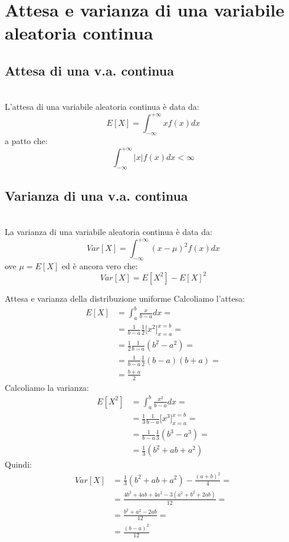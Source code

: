 \documentclass[12pt]{report}
\newcommand{\nmu}{}
\begin{document}
  	 	\section{Attesa e varianza di una variabile aleatoria continua}
  	 	\subsection{Attesa di una v.a. continua} \quad \\
  	 	L'attesa di una variabile aleatoria continua è data da:
  	 	\[
  	 	E[X] = \int_{-\infty}^{+\infty}xf(x)dx
  	 	\]
  	 	a patto che:
  	 	\[
  	 	\int_{-\infty}^{+\infty}|x|f(x)dx < \infty
  	 	\]
  	 	\subsection{Varianza di una v.a. continua} \quad \\
  	 	La varianza di una variabile aleatoria continua è data da:
  	 	\[
  	 	Var[X] = \int_{-\infty}^{+\infty}(x - \mu)^2f(x)dx
  	 	\]
  	 	ove $\mu = E[X]$ ed è ancora vero che:
  	 	\[
  	 	Var[X] = E[X^2] - E[X]^2
  	 	\]
  	 	\begin{example}{\nmu Attesa e varianza della distribuzione uniforme}{}
  	 		Calcoliamo l'attesa:
  	 		\begin{align*}
  	 		E[X] &= \int_{a}^{b}\frac{x}{b-a}dx = \\ &= \frac{1}{b-a}\frac{1}{2}\big[x^2\big]^{x=b}_{x=a} =\\ &=\frac{1}{2}\frac{1}{b-a}(b^2-a^2) = \\ &= \frac{1}{b-a}\frac{1}{2}(b-a)(b+a) = \\ &= \frac{b+a}{2}
  	 		\end{align*}
  	 		Calcoliamo la varianza:
  	 		\begin{align*}
  	 		E[X^2] &= \int_{a}^{b}\frac{x^2}{b-a}dx = \\ &= \frac{1}{3}\frac{1}{b-a}\big[x^3\big]^{x=b}_{x=a} = \\  &= \frac{1}{b-a}\frac{1}{3}(b^3 - a^3) = \\ &= \frac{1}{3}(b^2 + ab + a^2)
  	 		\end{align*}
  	 		Quindi:
  	 		\begin{align*}
  	 		Var[X] &= \frac{1}{3}(b^2 + ab + a^2) - \frac{(a+b)^2}{4} = \\ &= \frac{4b^2 + 4ab + 4a^2 - 3(a^2 + b^2 + 2ab)}{12} = \\ &= \frac{b^2 + a^2 - 2ab}{12} = \\ &= \frac{(b-a)^2}{12}
  	 		\end{align*}
  	 	\end{example}
\end{document}
